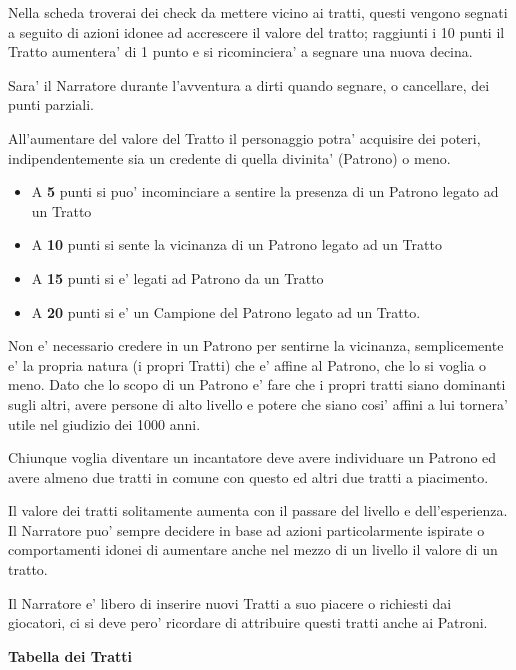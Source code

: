 \documentclass[a4paper,11pt,twoside,openany]{book}
\begin{document}
	Nella scheda troverai dei check da mettere vicino ai tratti, questi vengono segnati a seguito di azioni idonee ad accrescere il valore del tratto; raggiunti i 10 punti il Tratto aumentera' di 1 punto e si ricominciera' a segnare una nuova decina.
	
	Sara' il Narratore durante l'avventura a dirti quando segnare, o cancellare, dei punti parziali.
	
	All'aumentare del valore del Tratto il personaggio potra' acquisire dei poteri, indipendentemente sia un credente di quella divinita' (Patrono) o meno.
	
	\begin{itemize}
		\item A \textbf{5} punti si puo' incominciare a sentire la presenza di un Patrono
		legato ad un Tratto
		\item A \textbf{10} punti si sente la vicinanza di un Patrono legato ad un Tratto
		\item A \textbf{15} punti si e' legati ad Patrono da un Tratto
		\item A \textbf{20} punti si e' un Campione del Patrono legato ad un Tratto.
	\end{itemize}
	
	Non e' necessario credere in un Patrono per sentirne la vicinanza, semplicemente e' la propria natura (i propri Tratti) che e' affine al Patrono, che lo si voglia o meno.
	Dato che lo scopo di un Patrono e' fare che i propri tratti siano dominanti sugli altri, avere persone di alto livello e potere che siano cosi' affini a lui tornera' utile nel giudizio dei   1000 anni.
	
	Chiunque voglia diventare un incantatore deve avere individuare un Patrono ed avere almeno due tratti in comune con questo ed altri due tratti a piacimento.
	
	\smallskip
	
	Il valore dei tratti solitamente aumenta con il passare del livello e dell'esperienza. Il Narratore puo' sempre decidere in base ad azioni particolarmente ispirate o comportamenti idonei di aumentare anche nel mezzo di un livello il valore di un tratto.
	
	Il Narratore e' libero di inserire nuovi Tratti a suo piacere o richiesti dai giocatori, ci si deve pero' ricordare di attribuire questi tratti anche ai Patroni.
	
	\bigskip
	
	\textbf{Tabella dei Tratti}
	
	\medskip
	
\end{document}
